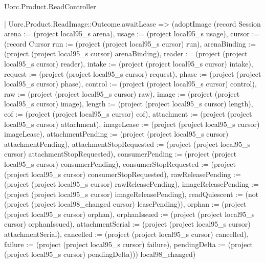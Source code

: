 \begin{lexlean}{Uorc.Product.ReadController}
\begin{semanticmodule}
{      | Uorc.Product.ReadImage::Outcome.awaitLease => (adoptImage (record Session {arena := (project local95_s arena), usage := (project local95_s usage), cursor := (record Cursor {run := (project (project local95_s cursor) run), arenaBinding := (project (project local95_s cursor) arenaBinding), reader := (project (project local95_s cursor) reader), intake := (project (project local95_s cursor) intake), request := (project (project local95_s cursor) request), phase := (project (project local95_s cursor) phase), control := (project (project local95_s cursor) control), raw := (project (project local95_s cursor) raw), image := (project (project local95_s cursor) image), length := (project (project local95_s cursor) length), eof := (project (project local95_s cursor) eof), attachment := (project (project local95_s cursor) attachment), imageLease := (project (project local95_s cursor) imageLease), attachmentPending := (project (project local95_s cursor) attachmentPending), attachmentStopRequested := (project (project local95_s cursor) attachmentStopRequested), consumerPending := (project (project local95_s cursor) consumerPending), consumerStopRequested := (project (project local95_s cursor) consumerStopRequested), rawReleasePending := (project (project local95_s cursor) rawReleasePending), imageReleasePending := (project (project local95_s cursor) imageReleasePending), readQuiescent := (not (project (project local98_changed cursor) leasePending)), orphan := (project (project local95_s cursor) orphan), orphanIssued := (project (project local95_s cursor) orphanIssued), attachmentSerial := (project (project local95_s cursor) attachmentSerial), cancelled := (project (project local95_s cursor) cancelled), failure := (project (project local95_s cursor) failure), pendingDelta := (project (project local95_s cursor) pendingDelta)})}) local98_changed)
}
\end{semanticmodule}
\end{lexlean}
